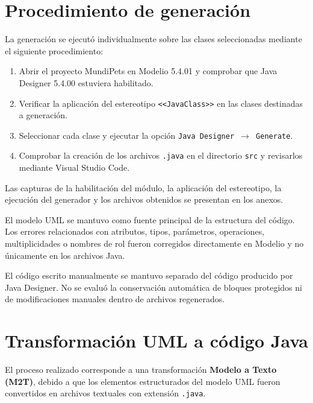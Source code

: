 \documentclass[10pt,a4paper,openany]{report}
\begin{document}
	\section{Procedimiento de generación}
	
	La generación se ejecutó individualmente sobre las clases seleccionadas
	mediante el siguiente procedimiento:
	
	\begin{enumerate}
		
		\item Abrir el proyecto MundiPets en Modelio 5.4.01 y comprobar que
		Java Designer 5.4.00 estuviera habilitado.
		
		\item Verificar la aplicación del estereotipo
		\texttt{\textless\textless JavaClass\textgreater\textgreater}
		en las clases destinadas a generación.
		
		\item Seleccionar cada clase y ejecutar la opción
		\texttt{Java Designer $\rightarrow$ Generate}.
		
		\item Comprobar la creación de los archivos \texttt{.java} en el
		directorio \texttt{src} y revisarlos mediante Visual Studio Code.
		
	\end{enumerate}
	
	Las capturas de la habilitación del módulo, la aplicación del
	estereotipo, la ejecución del generador y los archivos obtenidos se
	presentan en los anexos.
	
	El modelo UML se mantuvo como fuente principal de la estructura del
	código. Los errores relacionados con atributos, tipos, parámetros,
	operaciones, multiplicidades o nombres de rol fueron corregidos
	directamente en Modelio y no únicamente en los archivos Java.
	
	El código escrito manualmente se mantuvo separado del código producido
	por Java Designer. No se evaluó la conservación automática de bloques
	protegidos ni de modificaciones manuales dentro de archivos
	regenerados.
	
	\section{Transformación UML a código Java}
	
	El proceso realizado corresponde a una transformación
	\textbf{Modelo a Texto (M2T)}, debido a que los elementos estructurados
	del modelo UML fueron convertidos en archivos textuales con extensión
	\texttt{.java}.
	
\end{document}
